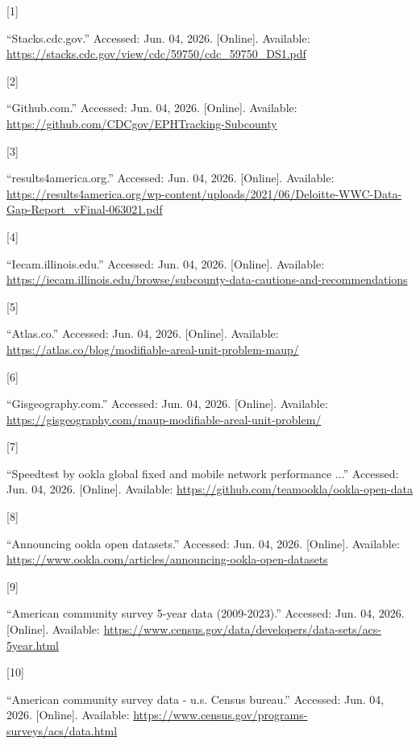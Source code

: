 \documentclass[
  letterpaper,
  DIV=11,
  numbers=noendperiod]{scrreprt}
\newlength{\cslhangindent}
\newlength{\csllabelwidth}
\newenvironment{CSLReferences}[2] %
 {\begin{list}{}{%
  \setlength{\itemindent}{0pt}
  \setlength{\leftmargin}{0pt}
  \setlength{\parsep}{0pt}
  \ifodd #1
   \setlength{\leftmargin}{\cslhangindent}
   \setlength{\itemindent}{-1\cslhangindent}
  \fi
  \setlength{\itemsep}{#2\baselineskip}}}
 {\end{list}}
\newcommand{\CSLLeftMargin}[1]{\parbox[t]{\csllabelwidth}{\strut#1\strut}}
\newcommand{\CSLRightInline}[1]{\parbox[t]{\linewidth - \csllabelwidth}{\strut#1\strut}}
\begin{document}
\label{refs}
\begin{CSLReferences}{0}{0}
\CSLLeftMargin{{[}1{]} }%
\CSLRightInline{{``Stacks.cdc.gov.''} Accessed: Jun. 04, 2026.
{[}Online{]}. Available:
\url{https://stacks.cdc.gov/view/cdc/59750/cdc_59750_DS1.pdf}}

\CSLLeftMargin{{[}2{]} }%
\CSLRightInline{{``Github.com.''} Accessed: Jun. 04, 2026. {[}Online{]}.
Available: \url{https://github.com/CDCgov/EPHTracking-Subcounty}}

\CSLLeftMargin{{[}3{]} }%
\CSLRightInline{{``results4america.org.''} Accessed: Jun. 04, 2026.
{[}Online{]}. Available:
\url{https://results4america.org/wp-content/uploads/2021/06/Deloitte-WWC-Data-Gap-Report_vFinal-063021.pdf}}

\CSLLeftMargin{{[}4{]} }%
\CSLRightInline{{``Iecam.illinois.edu.''} Accessed: Jun. 04, 2026.
{[}Online{]}. Available:
\url{https://iecam.illinois.edu/browse/subcounty-data-cautions-and-recommendations}}

\CSLLeftMargin{{[}5{]} }%
\CSLRightInline{{``Atlas.co.''} Accessed: Jun. 04, 2026. {[}Online{]}.
Available:
\url{https://atlas.co/blog/modifiable-areal-unit-problem-maup/}}

\CSLLeftMargin{{[}6{]} }%
\CSLRightInline{{``Gisgeography.com.''} Accessed: Jun. 04, 2026.
{[}Online{]}. Available:
\url{https://gisgeography.com/maup-modifiable-areal-unit-problem/}}

\CSLLeftMargin{{[}7{]} }%
\CSLRightInline{{``Speedtest by ookla global fixed and mobile network
performance ...''} Accessed: Jun. 04, 2026. {[}Online{]}. Available:
\url{https://github.com/teamookla/ookla-open-data}}

\CSLLeftMargin{{[}8{]} }%
\CSLRightInline{{``Announcing ookla open datasets.''} Accessed: Jun. 04,
2026. {[}Online{]}. Available:
\url{https://www.ookla.com/articles/announcing-ookla-open-datasets}}

\CSLLeftMargin{{[}9{]} }%
\CSLRightInline{{``American community survey 5-year data (2009-2023).''}
Accessed: Jun. 04, 2026. {[}Online{]}. Available:
\url{https://www.census.gov/data/developers/data-sets/acs-5year.html}}

\CSLLeftMargin{{[}10{]} }%
\CSLRightInline{{``American community survey data - u.s. Census
bureau.''} Accessed: Jun. 04, 2026. {[}Online{]}. Available:
\url{https://www.census.gov/programs-surveys/acs/data.html}}


\end{CSLReferences}
\end{document}
